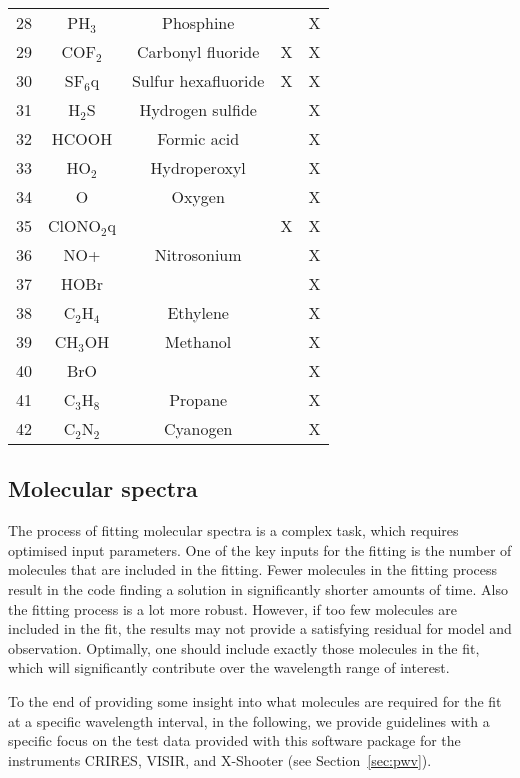 \begin{table*}[!ht]
\begin{center}
\begin{tabular}{r | c | c | c | c}
28 & PH$_3$  & Phosphine &  & X \\
29 & COF$_2$ & Carbonyl fluoride & X & X \\
30 & SF$_6$q  & Sulfur hexafluoride & X & X \\
\hline
31 & H$_2$S & Hydrogen sulfide  &  & X \\
32 & HCOOH & Formic acid &  & X \\
33 & HO$_2$ & Hydroperoxyl  &  & X \\
34 & O    & Oxygen &  & X \\
35 & ClONO$_2$q  &  & X & X \\
\hline
36 & NO+  & Nitrosonium &  & X \\
37 & HOBr &  &  & X \\
38 & C$_2$H$_4$ & Ethylene &  & X \\
39 & CH$_3$OH & Methanol &  & X \\
40 & BrO  &  &  & X \\
\hline
41 & C$_3$H$_8$ & Propane &  & X \\
42 & C$_2$N$_2$ & Cyanogen &  & X \\
\hline
\end{tabular}
\end{center}
\end{table*}

\clearpage

\subsection{Molecular spectra}\label{sec:spectra}
The process of fitting molecular spectra is a complex task, which requires
optimised input parameters. One of the key inputs for the fitting is the number
of molecules that are included in the fitting. Fewer molecules in the fitting
process result in the code finding a solution in significantly shorter amounts
of time. Also the fitting process is a lot more robust. However, if too few
molecules are included in the fit, the results may not provide a satisfying
residual for model and observation. Optimally, one should include exactly those
molecules in the fit, which will significantly contribute over the wavelength
range of interest.

To the end of providing some insight into what molecules are required for the
fit at a specific wavelength interval, in the following, we provide guidelines
with a specific focus on the test data provided with this software package for
the instruments CRIRES, VISIR, and X-Shooter (see Section~\ref{sec:pwv}).

